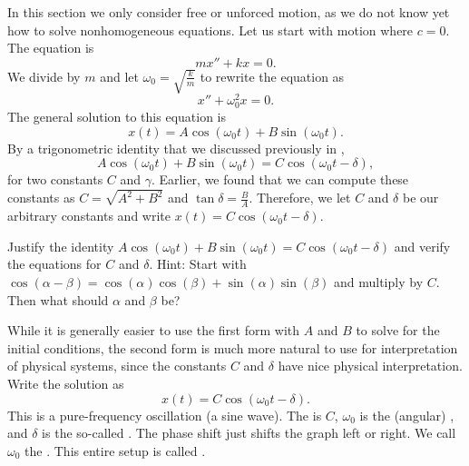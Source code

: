 \documentclass{ximera}
\begin{document}
In this section we only consider free or unforced motion, as we do not know yet how to solve nonhomogeneous equations.  Let us start with  motion where $c=0$.  The equation is
\begin{equation*}
    mx'' + kx = 0 .
\end{equation*}
We divide by $m$ and let $\omega_0 = \sqrt{\frac{k}{m}}$ to rewrite the equation as
\begin{equation*}
    x'' + \omega_0^2 x = 0 .
\end{equation*}
The general solution to this equation is
\begin{equation*}
    x(t) = A \cos (\omega_0 t) + B \sin (\omega_0 t) .
\end{equation*}
By a trigonometric identity that we discussed previously in ,
\begin{equation*}
    A \cos (\omega_0 t) + B \sin (\omega_0 t) = C \cos ( \omega_0 t - \delta ) ,
\end{equation*}
for two constants $C$ and $\gamma$. Earlier, we found that we can compute these constants as $C= \sqrt{A^2 + B^2}$ and $\tan \delta = \frac{B}{A}$.  Therefore, we let $C$ and $\delta$ be our arbitrary constants and write $x(t) = C \cos ( \omega_0 t - \delta )$.

\begin{exercise}
    Justify the identity $A \cos (\omega_0 t) + B \sin (\omega_0 t) = C \cos ( \omega_0 t - \delta )$ and verify the equations for $C$ and $\delta$.  Hint: Start with $\cos (\alpha-\beta) = \cos (\alpha) \cos (\beta) + \sin (\alpha)\sin (\beta)$ and multiply by $C$. Then what should $\alpha$ and $\beta$ be?
\end{exercise}

While it is generally easier to use the first form with $A$ and $B$ to solve for the initial conditions, the second form is much more natural to use for interpretation of physical systems, since the constants $C$ and $\delta$ have nice physical interpretation. Write the solution as
\begin{equation*}
    x(t) = C \cos ( \omega_0 t - \delta) .
\end{equation*}
This is a pure-frequency oscillation (a sine wave). The \emph{} is $C$, $\omega_0$ is the (angular) \emph{}, and $\delta$ is the so-called \emph{}. The phase shift just shifts the graph left or right. We call $\omega_0$ the \emph{}. This entire setup is called \emph{}.
\end{document}
